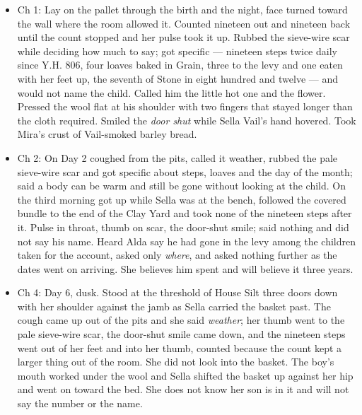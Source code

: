 \documentclass{design/chronicle}
\begin{document}
{
\begin{itemize}[leftmargin=1.4em,itemsep=1pt,topsep=3pt,parsep=0pt]

\item Ch 1: Lay on the pallet through the birth and the night, face turned toward the wall where the room allowed it. Counted nineteen out and nineteen back until the count stopped and her pulse took it up. Rubbed the sieve-wire scar while deciding how much to say; got specific --- nineteen steps twice daily since Y.H. 806, four loaves baked in Grain, three to the levy and one eaten with her feet up, the seventh of Stone in eight hundred and twelve --- and would not name the child. Called him the little hot one and the flower. Pressed the wool flat at his shoulder with two fingers that stayed longer than the cloth required. Smiled the \emph{door shut} while Sella Vail’s hand hovered. Took Mira’s crust of Vail-smoked barley bread.

\item Ch 2: On Day 2 coughed from the pits, called it weather, rubbed the pale sieve-wire scar and got specific about steps, loaves and the day of the month; said a body can be warm and still be gone without looking at the child. On the third morning got up while Sella was at the bench, followed the covered bundle to the end of the Clay Yard and took none of the nineteen steps after it. Pulse in throat, thumb on scar, the door-shut smile; said nothing and did not say his name. Heard Alda say he had gone in the levy among the children taken for the account, asked only \emph{where}, and asked nothing further as the dates went on arriving. She believes him spent and will believe it three years.

\end{itemize}

\begin{itemize}[leftmargin=1.4em,itemsep=1pt,topsep=3pt,parsep=0pt]

\item Ch 4: Day 6, dusk. Stood at the threshold of House Silt three doors down with her shoulder against the jamb as Sella carried the basket past. The cough came up out of the pits and she said \emph{weather}; her thumb went to the pale sieve-wire scar, the door-shut smile came down, and the nineteen steps went out of her feet and into her thumb, counted because the count kept a larger thing out of the room. She did not look into the basket. The boy’s mouth worked under the wool and Sella shifted the basket up against her hip and went on toward the bed. She does not know her son is in it and will not say the number or the name.


\end{itemize}}
\end{document}

